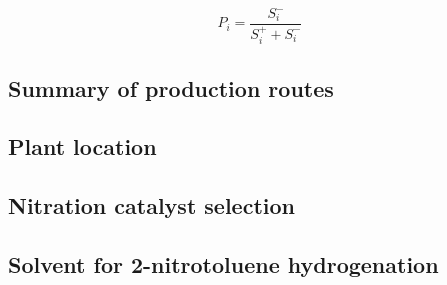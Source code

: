 \begin{equation}
    P_{i}=\frac{S_{i}^{-}}{S_{i}^{+}+S_{i}^{-}}
\end{equation}

\subsection{Summary of production routes}

\subsection{Plant location}

\subsection{Nitration catalyst selection}

\subsection{Solvent for 2-nitrotoluene hydrogenation}

